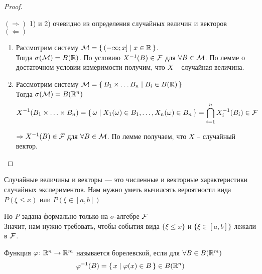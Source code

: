 \begin{proof}~

  $(\Rightarrow)$ 1) и 2) очевидно из определения случайных величин и векторов\\

  $(\Leftarrow)$ \nolinebreak
  \begin{enumerate}
    \item 
      Рассмотрим систему $\mathcal{M} = \left\{ \, (-\infty; x] \mid x \in \mathbb{R} \, \right\}$.\\
      Тогда  $\sigma(\mathcal{M}) = B(\mathbb{R})$. По условию $X^{-1} (B) \in \mathcal{F}$ для 
      $\forall B \in \mathcal{M}$. По лемме о достаточном условии измеримости получим, 
      что $X$ -- случайная величина.

    \item 
      Рассмотрим систему $\mathcal{M} = \left\{ \, B_1 \times \ldots B_n \mid B_i \in B(\mathbb{R}) \, \right\}$\\
      Тогда $\sigma(\mathcal{M}) = B(\mathbb{R}^n)$
      \begin{align*}
        &X^{-1} (B_1 \times \ldots \times B_n) = 
        \left\{ \, \omega \mid X_1(\omega) \in B_1, \ldots, X_n(\omega) \in B_n \, \right\}
        = \bigcap_{i = 1}^{n} X^{-1}_i (B_i) \in \mathcal{F}
      \end{align*}

      $\Rightarrow X^{-1} (B) \in \mathcal{F}$ для $\forall B \in \mathcal{M}$. По лемме получаем, 
      что $X$ -- случайный вектор.
  \end{enumerate}

\end{proof}


Случайные величины и векторы --- это численные и векторные характеристики случайных экспериментов. Нам нужно уметь вычилсять вероятности вида $P(\xi \leq x)$ или $P(\xi \in [a, b])$

Но $P$ задана формально только на $\sigma$-алгебре $\mathcal{F}$\\
Значит, нам нужно требовать, чтобы события вида $\{ \xi \leq x \}$ и 
$\{\xi \in [a, b]\}$ лежали в $\mathcal{F}$.


\begin{definition}
  Функция $\varphi\colon \mathbb{R}^n \to \mathbb{R}^m$ называется борелевской, 
  если для $\forall B \in B(\mathbb{R}^m)$
  \begin{align*}
    \varphi^{-1} (B) = \left\{ \, x \mid \varphi(x) \in B \, \right\} \in B(\mathbb{R}^n)
  \end{align*}
\end{definition}

